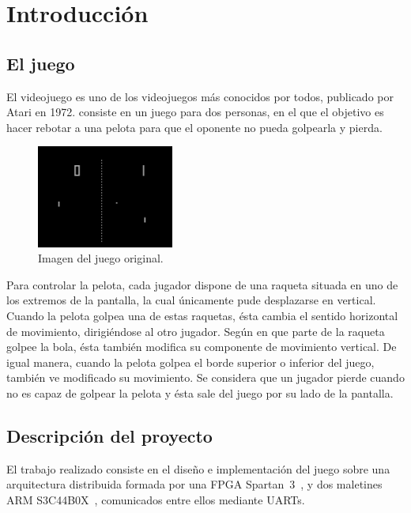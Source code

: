\section{Introducción}
\label{s1:sec:Introduccion}

\subsection{El juego}
\label{s1:subsec:elJuego}
El videojuego \pong es uno de los videojuegos más conocidos por todos,
publicado por Atari en 1972. \pong consiste en un juego para dos personas,
en el que el objetivo es hacer rebotar a una pelota para que el oponente no
pueda golpearla y pierda.
\begin{figure}[h]
  \centering
  \includegraphics[width=0.4\textwidth]{images/pong.png}
  \caption{Imagen del juego original.}
  \label{s1:fig:pong}
\end{figure}

Para controlar la pelota, cada jugador dispone de una raqueta situada en
uno de los extremos de la pantalla, la cual únicamente pude desplazarse en
vertical. Cuando la pelota golpea una de estas raquetas, ésta cambia el
sentido horizontal de movimiento, dirigiéndose al otro jugador. Según en
que parte de la raqueta golpee la bola, ésta también modifica su componente
de movimiento vertical. De igual manera, cuando la pelota golpea el borde
superior o inferior del juego, también ve modificado su movimiento.  Se
considera que un jugador pierde cuando no es capaz de golpear la pelota y
ésta sale del juego por su lado de la pantalla.


\subsection{Descripción del proyecto}
\label{s1:subsec:objetivos}
El trabajo realizado consiste en el diseño e implementación del juego \pong
sobre una arquitectura distribuida formada por una FPGA Spartan~3~\cite{Spartan3}, y
dos maletines ARM S3C44B0X~\cite{maletinARM}, comunicados entre ellos
mediante UARTs.

